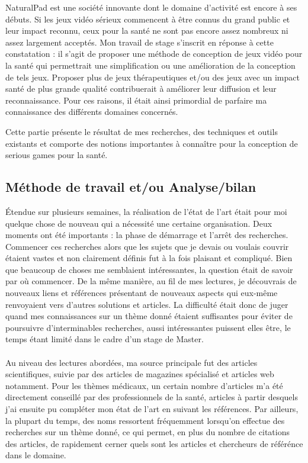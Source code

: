 NaturalPad est une société innovante dont le domaine d'activité est encore à ses débuts. Si les jeux vidéo sérieux commencent à être connus du grand public et leur impact reconnu, ceux pour la santé ne sont pas encore assez nombreux ni assez largement acceptés. Mon travail de stage s'inscrit en réponse à cette constatation : il s'agit de proposer une méthode de conception de jeux vidéo pour la santé qui permettrait une simplification ou une amélioration de la conception de tels jeux. Proposer plus de jeux  thérapeutiques et/ou des jeux avec un impact santé de plus grande qualité contribuerait à améliorer leur diffusion et leur reconnaissance. Pour ces raisons, il était ainsi primordial de parfaire ma connaissance des différents domaines concernés.

Cette partie présente le résultat de mes recherches, des techniques et outils existants et comporte des notions importantes à connaître pour la conception de serious games pour la santé.

	\subsection*{Méthode de travail et/ou Analyse/bilan}
Étendue sur plusieurs semaines, la réalisation de l'état de l'art était pour moi quelque chose de nouveau qui a nécessité une certaine organisation. Deux moments ont été importants : la phase de démarrage et l'arrêt des recherches. Commencer ces recherches alors que les sujets que je devais ou voulais couvrir étaient vastes et non clairement définis fut à la fois plaisant et compliqué. Bien que beaucoup de choses me semblaient intéressantes, la question était de savoir par où commencer. De la même manière, au fil de mes lectures, je découvrais de nouveaux liens et références présentant de nouveaux aspects qui eux-même renvoyaient vers d'autres solutions et articles. La difficulté était donc de juger quand mes connaissances sur un thème donné étaient suffisantes pour éviter de poursuivre d'interminables recherches, aussi intéressantes puissent elles être, le temps étant limité dans le cadre d'un stage de Master.
\paragraph{}Au niveau des lectures abordées, ma source principale fut des articles scientifiques, suivie par des articles de magazines spécialisé et articles web notamment. Pour les thèmes médicaux, un certain nombre d'articles m'a été directement conseillé par des professionnels de la santé, articles à partir desquels j'ai ensuite pu compléter mon état de l'art en suivant les références. Par ailleurs, la plupart du temps, des noms ressortent fréquemment lorsqu'on effectue des recherches sur un thème donné, ce qui permet, en plus du nombre de citations des articles, de rapidement cerner quels sont les articles et chercheurs de référénce dans le domaine.
